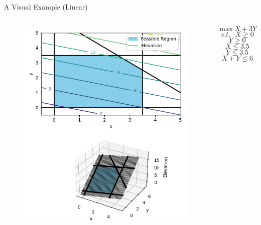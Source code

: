 \documentclass[10pt, aspectratio=169]{beamer}
\begin{document}
\begin{frame}{A Visual Example (Linear)}
    \begin{columns}
        \begin{column}{0.5\textwidth}
            \begin{figure}
                \includegraphics[width=0.8\linewidth]{LinearObjective.png}
            \end{figure}
        \end{column}
        \begin{column}{0.5\textwidth}
            $$\max X + 3Y - 0.5$$
            $$s.t. \ \ \ X\geq 0$$
            $$Y \geq 0$$
            $$X \leq 3.5$$
            $$Y \leq 3.5$$
            $$X + Y \leq 6$$
        \end{column}
    \end{columns}
\end{frame}
\end{document}

